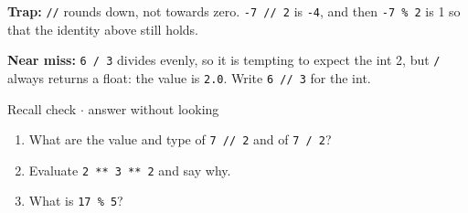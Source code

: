 \documentclass[11pt]{article}
\begin{document}
\begin{keepsection}
\begin{notebox}\textbf{Trap:} \texttt{//} rounds down, not towards zero. \texttt{-7 // 2} is \texttt{-4}, and then \texttt{-7 \% 2} is 1 so that the identity above still holds.\end{notebox}

\begin{notebox}\textbf{Near miss:} \texttt{6 / 3} divides evenly, so it is tempting to expect the int 2, but \texttt{/} always returns a float: the value is \texttt{2.0}. Write \texttt{6 // 3} for the int.\end{notebox}

\begin{recallbox}{Recall check \ensuremath{\cdot} answer without looking}
\begin{enumerate}
\item What are the value and type of \texttt{7 // 2} and of \texttt{7 / 2}?
\item Evaluate \texttt{2 ** 3 ** 2} and say why.
\item What is \texttt{17 \% 5}?
\end{enumerate}

\end{recallbox}
\end{keepsection}
\end{document}
